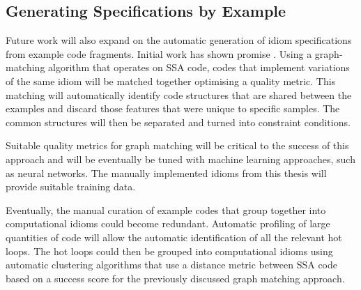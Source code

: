 \subsection*{Generating Specifications by Example}

    Future work will also expand on the automatic generation of idiom
    specifications from example code fragments.
    Initial work has shown promise \citep{DBLP:conf/IEEEpact/CollieGO19}.
    Using a graph-matching algorithm that operates on SSA code, codes that
    implement variations of the same idiom will be matched together optimising
    a quality metric.
    This matching will automatically identify code structures that are shared
    between the examples and discard those features that were unique to
    specific samples.
    The common structures will then be separated and turned into constraint
    conditions.

    Suitable quality metrics for graph matching will be critical to the success
    of this approach and will be eventually be tuned with machine learning
    approaches, such as neural networks.
    The manually implemented idioms from this thesis will provide suitable
    training data.

    Eventually, the manual curation of example codes that group together into
    computational idioms could become redundant.
    Automatic profiling of large quantities of code will allow the automatic
    identification of all the relevant hot loops.
    The hot loops could then be grouped into computational idioms using
    automatic clustering algorithms that use a distance metric between SSA code
    based on a success score for the previously discussed graph matching
    approach.
